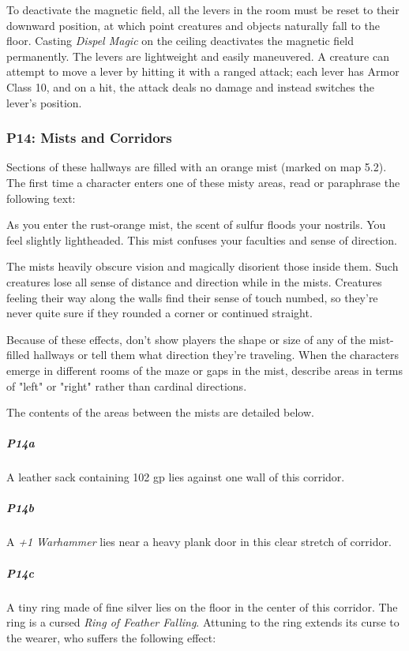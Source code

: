 \documentclass[10pt,a4paper,twoside,bg=print,twocolumn,openany,nodeprecatedcode]{dndbook}
\begin{document}
To deactivate the magnetic field, all the levers in the room must be reset to their downward position, at which point creatures and objects naturally fall to the floor. Casting \textit{Dispel Magic} on the ceiling deactivates the magnetic field permanently. The levers are lightweight and easily maneuvered. A creature can attempt to move a lever by hitting it with a ranged attack; each lever has Armor Class 10, and on a hit, the attack deals no damage and instead switches the lever's position.

\subsubsection{P14: Mists and Corridors}
Sections of these hallways are filled with an orange mist (marked on map 5.2). The first time a character enters one of these misty areas, read or paraphrase the following text:

\begin{DndReadAloud}{}
As you enter the rust-orange mist, the scent of sulfur floods your nostrils. You feel slightly lightheaded. This mist confuses your faculties and sense of direction.

\end{DndReadAloud}

The mists heavily obscure vision and magically disorient those inside them. Such creatures lose all sense of distance and direction while in the mists. Creatures feeling their way along the walls find their sense of touch numbed, so they're never quite sure if they rounded a corner or continued straight.

Because of these effects, don't show players the shape or size of any of the mist-filled hallways or tell them what direction they're traveling. When the characters emerge in different rooms of the maze or gaps in the mist, describe areas in terms of "left" or "right" rather than cardinal directions.

The contents of the areas between the mists are detailed below.

\subparagraph{P14a}
A leather sack containing 102 gp lies against one wall of this corridor.

\subparagraph{P14b}
A \textit{+1 Warhammer} lies near a heavy plank door in this clear stretch of corridor.

\subparagraph{P14c}
A tiny ring made of fine silver lies on the floor in the center of this corridor. The ring is a cursed \textit{Ring of Feather Falling}. Attuning to the ring extends its curse to the wearer, who suffers the following effect:
\end{document}
